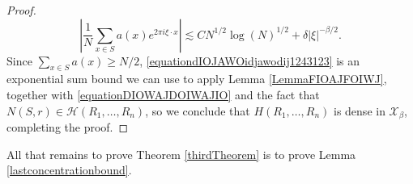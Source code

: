 \documentclass[dvipsnames,letterpaper,12pt]{article}
\numberwithin{equation}{section}
\numberwithin{theorem}{section}
\begin{document}
\begin{proof}
    \begin{equation} \label{equationdIOJAWOidjawodij1243123}
        \left| \frac{1}{N} \sum_{x \in S} a(x) e^{2 \pi i \xi \cdot x} \right| \lesssim C N^{1/2} \log(N)^{1/2} + \delta |\xi|^{-\beta/2}.
    \end{equation}
    Since $\sum_{x \in S} a(x) \geq N/2$, \eqref{equationdIOJAWOidjawodij1243123} is an exponential sum bound we can use to apply Lemma \ref{LemmaFIOAJFOIWJ}, together with \eqref{equationDIOWAJDOIWAJIO} and the fact that $N(S,r) \in \mathcal{H}(R_1,\dots,R_n)$, so we conclude that $H(R_1,\dots,R_n)$ is dense in $\mathcal{X}_\beta$, completing the proof.
\end{proof}

All that remains to prove Theorem \ref{thirdTheorem} is to prove Lemma \ref{lastconcentrationbound}.
\end{document}

